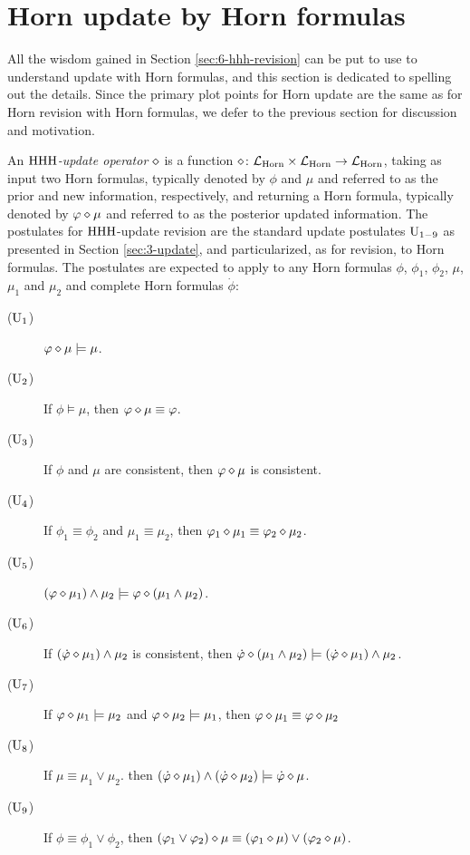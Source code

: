 \section{Horn update by Horn formulas}\label{sec:6-hhh-update}
All the wisdom gained in Section \ref{sec:6-hhh-revision} can be put to 
use to understand update with Horn formulas,
and this section is dedicated to spelling out the details.
Since the primary plot points for Horn update are the same as for Horn revision with 
Horn formulas, we defer to the previous section for discussion and motivation.

An \emph{${\mathrm{HHH}}$-update operator $\diamond$} is a function  
$\diamond\colon\mathcal{L}_{\mathrm{Horn}}\times\mathcal{L}_{\mathrm{Horn}}\rightarrow\mathcal{L}_{\mathrm{Horn}}$,
taking as input two Horn formulas, 
typically denoted by $\phi$ and $\mu$
and referred to as the prior and new information, respectively,
and returning a Horn formula,
typically denoted by $\varphi\diamond\mu$
and referred to as the posterior updated information.
The postulates for ${\mathrm{HHH}}$-update revision
are the standard update postulates $\mathrm{U}_{1-9}$
as presented in Section \ref{sec:3-update},
and particularized, as for revision, to Horn formulas.
The postulates are expected to 
apply to any Horn formulas
$\phi$, $\phi_{1}$, $\phi_{2}$,
$\mu$, $\mu_{1}$ and $\mu_{2}$
and complete Horn formulas $\dot{\phi}$:

\begin{description}
	\item[($\mathrm{U}_{1}$)] $\varphi\diamond\mu\models\mu$.	
	\item[($\mathrm{U}_{2}$)] If $\phi\models\mu$, then $\varphi\diamond\mu\equiv\varphi$.
	\item[($\mathrm{U}_{3}$)] If $\phi$ and $\mu$ are consistent, 
		then $\varphi\diamond\mu$ is consistent.
	\item[($\mathrm{U}_{4}$)] If $\phi_1\equiv\phi_2$ and $\mu_1\equiv\mu_2$, 
		then $\varphi_1\diamond\mu_1\equiv\varphi_2\diamond\mu_2$.
	\item[($\mathrm{U}_{5}$)] $(\varphi\diamond\mu_1)\land\mu_2\models\varphi\diamond(\mu_1\land\mu_2)$.
	\item[($\mathrm{U}_{6}$)] If $(\dot{\varphi}\diamond\mu_1)\land\mu_2$ is consistent, 
		then $\dot{\varphi}\diamond(\mu_1\land\mu_2)\models(\dot{\varphi}\diamond\mu_1)\land\mu_2$.
	\item[($\mathrm{U}_{7}$)] If $\varphi\diamond\mu_1\models\mu_2$ and $\varphi\diamond\mu_2\models\mu_1$, 
		then $\varphi\diamond\mu_1\equiv\varphi\diamond\mu_2$
	\item[($\mathrm{U}_{8}$)] If $\mu\equiv \mu_{1}\lor\mu_{2}$.
		then $(\dot{\varphi}\diamond\mu_1)\land(\dot{\varphi}\diamond\mu_2)\models\dot{\varphi}\diamond\mu$.
	\item[($\mathrm{U}_{9}$)] If $\phi\equiv\phi_1\lor\phi_2$,
		then $(\varphi_{1}\lor\varphi_{2})\diamond\mu\equiv(\varphi_1\diamond\mu)\lor(\varphi_2\diamond\mu)$.
\end{description}

